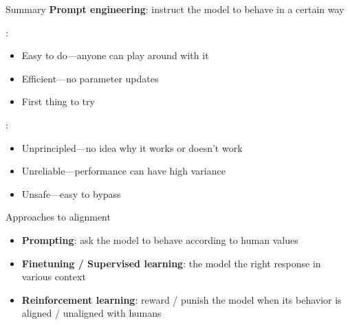 \documentclass[usenames,dvipsnames,notes,11pt,aspectratio=169,hyperref={colorlinks=true, linkcolor=blue}]{beamer}
\begin{document}
\begin{frame}
    {Summary}
    \textbf{Prompt engineering}: instruct the model to behave in a certain way

    :\\
    \begin{itemize}
        \item Easy to do---anyone can play around with it 
        \item Efficient---no parameter updates
        \item First thing to try
    \end{itemize}

    \pause
    :\\
    \begin{itemize}
        \item Unprincipled---no idea why it works or doesn't work
        \item Unreliable---performance can have high variance 
        \item Unsafe---easy to bypass 
    \end{itemize}
\end{frame}

\begin{frame}
    {Approaches to alignment}
    \begin{itemize}
        \itemsep1em
            
        \item \textcolor{fg!20}{
                \textbf{Prompting}: {ask} the model to behave according to human values
        }
        \item \textbf{Finetuning / Supervised learning}:  the model the right response in various context
        \item \textcolor{fg!20}{
                \textbf{Reinforcement learning}: {reward / punish} the model when its behavior is aligned / unaligned with humans 
            }
    \end{itemize}
\end{frame}
\end{document}
